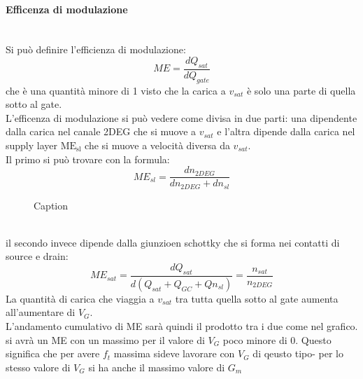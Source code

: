 \paragraph{Efficenza di modulazione}\mbox{}\\
Si può definire l'efficienza di modulazione:
\begin{equation}
    ME=\dfrac{dQ_{sat}}{dQ_{gate}}
\end{equation}
che è una quantità minore di 1 visto che la carica a $v_{sat}$ è solo una parte di quella sotto al gate.\\
L'efficenza di modulazione si può vedere come divisa in due parti: una dipendente dalla carica nel canale 2DEG che si muove a $v_{sat}$ e l'altra dipende dalla carica nel supply layer $\text{ME}_\text{sl}$ che si muove a velocità diversa da $v_{sat}$.\\
Il primo si può trovare con la formula:
\begin{equation}
    ME_{sl}=\dfrac{dn_{2DEG}}{dn_{2DEG}+dn_{sl}}
\end{equation}
\begin{figure}[hbt!]
    \centering
    \caption{Caption}%
    \label{fig:enter-label}
\end{figure}
\\%
il secondo invece dipende dalla giunzioen schottky che si forma nei contatti di source e drain:
\begin{equation}
    ME_{sat}=\dfrac{dQ_{sat}}{d(Q_{sat}+Q_{GC}+Qn_{sl})}=\dfrac{n_{sat}}{n_{2DEG}}
\end{equation}
La quantità di carica che viaggia a $v_{sat}$ tra tutta quella sotto al gate aumenta all'aumentare di $V_G$.\\
L'andamento cumulativo di ME sarà quindi il prodotto tra i due come nel grafico. si avrà un ME con un massimo per il valore di $V_G$ poco minore di 0. Questo significa che per avere $f_t$ massima sideve lavorare con $V_G$ di qeusto tipo- per lo stesso valore di $V_G$ si ha anche il massimo valore di $G_m$
